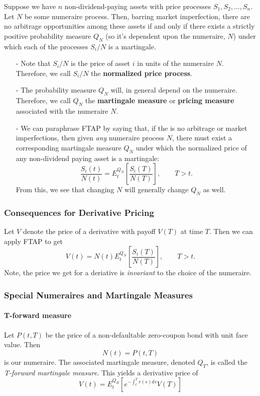 \documentclass[a4paper,12pt]{scrartcl}
\begin{document}
Suppose we have $n$ non-dividend-paying assets with
price processes $S_1, S_2, \ldots, S_n$.  Let $N$ be some numeraire
process.  Then, barring market imperfection, there are no arbitrage
opportunities among these assets if and only if there exists a strictly
positive probability measure $Q_N$ (so it's dependent upon the numeraire,
$N$) under which each of the processes $S_i / N$ is a martingale.
\begin{itemize}
   \item[-]{Note that $S_i/N$ is the price of asset $i$ in units of the
      numeraire $N$.  Therefore, we call $S_i/N$ the \textbf{normalized
      price process}.}
   \item[-]{The probability measure $Q_N$ will, in general depend on
	 the numeraire.  Therefore, we call $Q_N$ the 
	 \textbf{martingale measure} or \textbf{pricing measure} 
	 associated with the numeraire $N$.} 
   \item[-]{We can paraphrase FTAP by saying that, if the is no arbitrage
	 or market imperfections, then given \emph{any} numeraire 
	 process $N$, there must exist a corresponding martingale
	 measure $Q_N$ under which the normalized price of any 
	 non-dividend paying asset is a martingale:
	    \[ \frac{S_i(t)}{N(t)} = E_t^{Q_N}\left[ \frac{S_i(T)}{N(T)}
	       \right], \qquad T > t. \]
	 From this, we see that changing $N$ will generally change 
	 $Q_N$ as well.
      }
\end{itemize}

\subsubsection{Consequences for Derivative Pricing}

Let $V$ denote the price of a derivative with payoff $V(T)$ at time $T$.
Then we can apply FTAP to get
   \[ V(t) = N(t) E_t^{Q_N} \left[ \frac{S_i(T)}{N(T)}
	       \right], \qquad T > t. \]
Note, the price we get for a deriative is \emph{invariant} to the choice
of the numeraire.

\subsubsection{Special Numeraires and Martingale Measures}

\paragraph{T-forward measure} Let $P(t,T)$ be the price of a
non-defaultable zero-coupon bond with unit face value.  Then
   \[ N(t) = P(t,T) \]
is our numeraire.  The associated martingale measure, denoted 
$Q_T$, is called the \emph{T-forward martingale measure}. This yields
a derivative price of 
   \[ V(t) = E_t^{Q_B} \left[ e^{-\int_t^T r(s) ds} V(T)\right] \]
\end{document}
